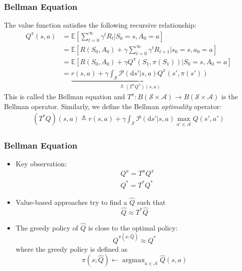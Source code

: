 \documentclass{beamer}
\newcommand{\eqdef}{\triangleq}
\newcommand{\EE}[1]{{\mathbb E}\left[#1\right]}
\newcommand{\Qopt}{Q^*}
\newcommand{\Qpi}{Q^\pi}
\newcommand{\Qhat}{\hat{Q}}
\newcommand{\Tpi}{T^\pi}
\newcommand{\Topt}{{T^*}}
\newcommand{\piopt}{{\pi^*}}
\newcommand{\argmax}{\mathop{\text{argmax}}}
\newcommand{\States}{\mathcal{S}}
\newcommand{\Actions}{\mathcal{A}}
\newcommand{\PKernel}{\mathcal{P}}
\newcommand{\SA}{\States\times\Actions}
\newcommand{\ds}{\mathrm{d}s}
\newcommand{\ra}{\rightarrow}
\begin{document}
\begin{frame}\frametitle{Bellman Equation}\small
The value function satisfies the following recursive relationship:
\begin{align*}
  \Qpi(s,a) & = \EE{\sum_{t=0}^\infty \gamma^t R_t | S_0 = s, A_0 = a }
  \\
  &
  = \EE{R(S_0, A_0) + \gamma \sum_{t = 0}^\infty \gamma^t R_{t+1} | s_0 = s, a_0 = a }
  \\
  &  
  = \EE{R(S_0, A_0) + \gamma \Qpi(S_1, \pi(S_1)) | S_0 = s, A_0 = a }
  \\
  &
  =
  \underbrace{
  r(s,a) + \gamma \int_\States \PKernel(\ds' | s, a) \Qpi (s', \pi(s')) }_{\eqdef (\Tpi \Qpi)(s,a) }
\end{align*}
This is called the Bellman equation and $\Tpi: B(\SA) \ra B(\SA)$ is the Bellman operator.
Similarly, we define the Bellman \emph{optimality} operator:
\begin{align*}
  (\Topt Q)(s,a) \eqdef r(s,a) + \gamma \int_\States \PKernel(\ds' | s,a) \max_{a' \in \Actions} Q(s',a')
\end{align*}
\end{frame}


\begin{frame}\frametitle{Bellman Equation}\small
\begin{itemize}
	\item Key observation:
	\begin{align*}
	  & \Qpi = \Tpi \Qpi \\
	  & \Qopt = \Topt \Qopt
	\end{align*}

	\item Value-based approaches try to find a $\Qhat$ such that
	\[
	  \Qhat \approx \Topt \Qhat
	\]

	\item The greedy policy of $\Qhat$ is close to the optimal policy:
	\[
		  Q^{\pi(x;\Qhat)} \approx \Qopt
	\]
	where the greedy policy is defined as
	\[
	  \pi(s; \Qhat) \leftarrow \argmax_{a \in \Actions} \Qhat(s,a)
	\]
\end{itemize}
\end{frame}
\end{document}
